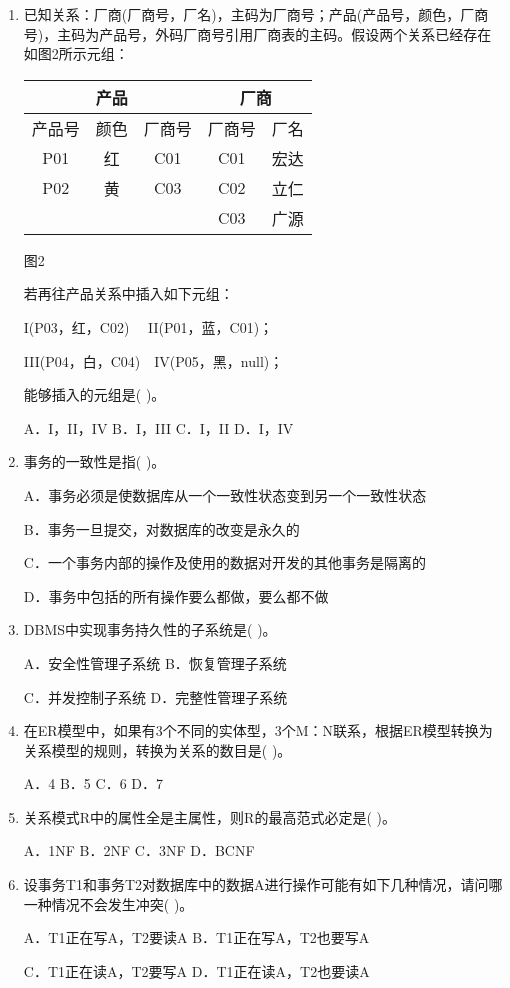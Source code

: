 \documentclass{article}
\begin{document}
\begin{enumerate}
\item 已知关系：厂商(厂商号，厂名)，主码为厂商号；产品(产品号，颜色，厂商号)，主码为产品号，外码厂商号引用厂商表的主码。假设两个关系已经存在如图2所示元组：

\begin{tabular}{ccc|cc}
\multicolumn{3}{c|}{产品} & \multicolumn{2}{c}{厂商} \\
\hline
产品号 & 颜色 & 厂商号 & 厂商号 & 厂名 \\
\hline
P01 & 红 & C01 & C01 & 宏达 \\
P02 & 黄 & C03 & C02 & 立仁 \\
 &  &  & C03 & 广源 \\
\end{tabular}

图2

若再往产品关系中插入如下元组：

I(P03，红，C02)　 II(P01，蓝，C01)；

III(P04，白，C04)　IV(P05，黑，null)；

能够插入的元组是( )。

A．I，II，IV B．I，III C．I，II D．I，IV

\item 事务的一致性是指( )。

A．事务必须是使数据库从一个一致性状态变到另一个一致性状态

B．事务一旦提交，对数据库的改变是永久的

C．一个事务内部的操作及使用的数据对开发的其他事务是隔离的

D．事务中包括的所有操作要么都做，要么都不做

\item DBMS中实现事务持久性的子系统是( )。

A．安全性管理子系统 B．恢复管理子系统

C．并发控制子系统 D．完整性管理子系统

\item 在ER模型中，如果有3个不同的实体型，3个M：N联系，根据ER模型转换为关系模型的规则，转换为关系的数目是( )。

A．4 B．5 C．6 D．7

\item 关系模式R中的属性全是主属性，则R的最高范式必定是( )。

A．1NF B．2NF C．3NF D．BCNF

\item 设事务T1和事务T2对数据库中的数据A进行操作可能有如下几种情况，请问哪一种情况不会发生冲突( )。

A．T1正在写A，T2要读A        B．T1正在写A，T2也要写A

C．T1正在读A，T2要写A        D．T1正在读A，T2也要读A
\end{enumerate}
\end{document}
